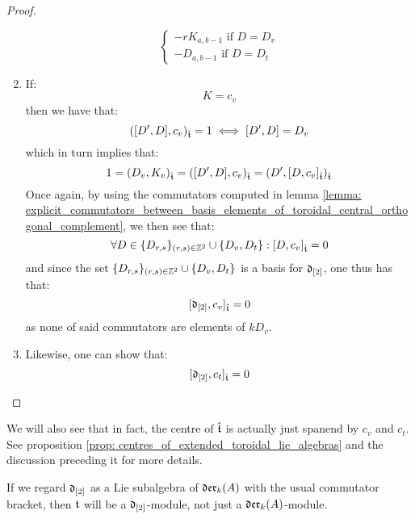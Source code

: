 \begin{proof}
\begin{enumerate}
$$\begin{cases}
                                \text{$-r K_{a, b - 1}$ if $D = D_v$}
                                \\
                                \text{$- D_{a, b - 1}$ if $D = D_t$}
                            \end{cases}
                        $$
                    \item If:
                        $$K = c_v$$
                    then we have that:
                        $$([D', D], c_v)_{\hat{\mathfrak{t}}} = 1 \iff [D', D] = D_v$$
                    which in turn implies that:
                        $$1 = (D_v, K_v)_{\hat{\mathfrak{t}}} = ([D', D], c_v)_{\hat{\mathfrak{t}}} = (D', [D, c_v]_{\hat{\mathfrak{t}}})_{\hat{\mathfrak{t}}}$$
                    Once again, by using the commutators computed in lemma \ref{lemma: explicit_commutators_between_basis_elements_of_toroidal_central_orthogonal_complement}, we then see that:
                        $$\forall D \in \{D_{r, s}\}_{(r, s) \in \mathbb{Z}^2} \cup \{D_v, D_t\}: [D, c_v]_{\hat{\mathfrak{t}}} = 0$$
                    and since the set $\{D_{r, s}\}_{(r, s) \in \mathbb{Z}^2} \cup \{D_v, D_t\}$ is a basis for $\mathfrak{d}_{[2]}$, one thus has that:
                        $$[\mathfrak{d}_{[2]}, c_v]_{\hat{\mathfrak{t}}} = 0$$
                    as none of said commutators are elements of $k D_v$.
                    \item Likewise, one can show that:
                        $$[\mathfrak{d}_{[2]}, c_t]_{\hat{\mathfrak{t}}} = 0$$
                \end{enumerate}
            \end{proof}
        We will also see that in fact, the centre of $\hat{\mathfrak{t}}$ is actually just spanend by $c_v$ and $c_t$. See proposition \ref{prop: centres_of_extended_toroidal_lie_algebras} and the discussion preceding it for more details.
        
        \begin{proposition} \label{prop: toroidal_lie_algebras_as_modules_over_div_0_vector_field_lie_algebras}
            If we regard $\mathfrak{d}_{[2]}$ as a Lie subalgebra of $\mathfrak{der}_k(A)$ with the usual commutator bracket, then $\mathfrak{t}$ will be a $\mathfrak{d}_{[2]}$-module, not just a $\mathfrak{der}_k(A)$-module.
        \end{proposition}
        
